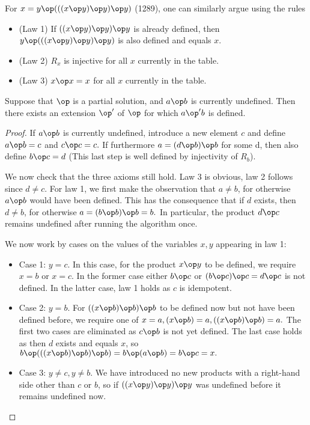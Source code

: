 For $x = y \op (((x \op y) \op y) \op y)$ (1289), one can similarly argue using the rules
\begin{itemize}
\item (Law 1) If $((x \op y) \op y) \op y$ is already defined, then $y \op (((x \op y) \op y) \op y)$ is also defined and equals $x$.
\item (Law 2) $R_x$ is injective for all $x$ currently in the table.
\item (Law 3) $x\op x=x$ for all $x$ currently in the table.
\end{itemize}

\begin{lemma}[1289 extension]\label{1289-extension}\leanok{}  Suppose that $\op$ is a partial solution, and $a \op b$ is currently undefined.  Then there exists an extension $\op'$ of $\op$ for which $a \op' b$ is defined.
\end{lemma}

\begin{proof}
If $a \op b$ is currently undefined, introduce a new element $c$ and define $a \op b = c$ and $ c \op c = c.$ If furthermore $a = (d \op b) \op b$ for some d, then also define $b \op c = d$ (This last step is well defined by injectivity of $R_b$).

We now check that the three axioms still hold. Law 3 is obvious, law 2 follows since $d \not = c$. For law 1, we first make the observation that $a \not = b$, for otherwise $a \op b$ would have been defined. This has the consequence that if $d$ exists, then $d \not = b$, for otherwise $a = (b \op b) \op b = b.$ In particular, the product $d \op c$ remains undefined after running the algorithm once.

We now work by cases on the values of the variables $x,y$ appearing in law 1:
\begin{itemize}
\item Case 1: $y=c$. In this case, for the product $x \op y$ to be defined, we require $x =b$ or $x = c$. In the former case either $b \op c$ or $(b \op c) \op c = d \op c$ is not defined. In the latter case, law 1 holds as $c$ is idempotent.
\item Case 2: $y=b$. For $((x \op b) \op b) \op b$ to be defined now but not have been defined before, we require one of $x= a, (x \op b) = a, ((x \op b) \op b) = a.$ The first two cases are eliminated as $c \op b$ is not yet defined. The last case holds as then $d$ exists and equals $x$, so $b \op (((x \op b) \op b) \op b) = b \op (a \op b) = b \op c = x.$
\item Case 3: $y \not = c, y \not = b$. We have introduced no new products with a right-hand side other than $c$ or $b$, so if $((x \op y) \op y) \op y$ was undefined before it remains undefined now.
\end{itemize}
\end{proof}

